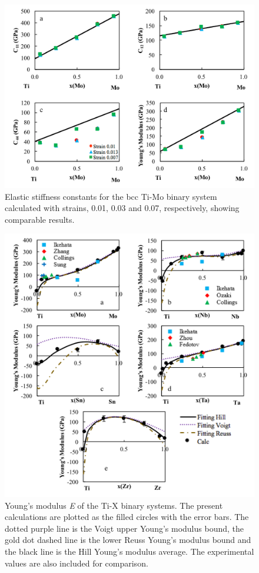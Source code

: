 \pagebreak
\begin{figure}[H]
	\centering
	\includegraphics[width=\textwidth]{Chapter-5/Figures/Strain.png}
	\caption{Elastic stiffness constants for the bcc Ti-Mo binary system calculated with strains, 0.01, 0.03 and 0.07, respectively, showing comparable results.}
	\label{Ch5-figure:Strain}
\end{figure}

\pagebreak
\begin{figure}[H]
	\centering
	\includegraphics[width=\textwidth]{Chapter-5/Figures/tixyoungs.png}
	\caption{Young's modulus \textit{E} of the Ti-X binary systems. The present calculations are plotted as the filled circles with the error bars. The dotted purple line is the Voigt upper Young's modulus bound, the gold dot dashed line is the lower Reuss Young's modulus bound and the black line is the Hill Young's modulus average. The experimental values \cite{Ikehata2004,Zhang2015,Boyer1994,Sung2015,Ozaki2004,Fedotov1985,Zhou2009a,Zhou2004a,Friak2012,Wu2010a} are also included for comparison. }
	\label{Ch5-figure:tixyoungs}
\end{figure}

